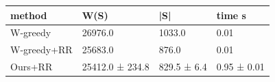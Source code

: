 \begin{tabular}{llll}
\toprule
method & W(S) & |S| & time s \\
\midrule
W-greedy & 26976.0 & 1033.0 & 0.01 \\
W-greedy+RR & 25683.0 & 876.0 & 0.01 \\
Ours+RR & 25412.0 ± 234.8 & 829.5 ± 6.4 & 0.95 ± 0.01 \\
\bottomrule
\end{tabular}
